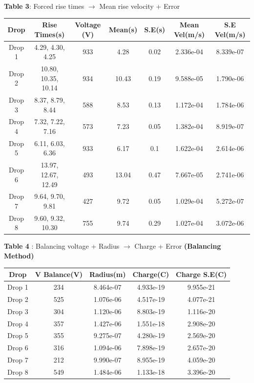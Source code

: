 \documentclass{article}
\begin{document}
\vspace{20pt}

\textbf{Table 3}: Forced rise times $\rightarrow$ Mean rise velocity + Error

\begin{tabular}{|c|c|c|c|c|S|S|}
  \hline
  \textbf{Drop} & \textbf{Rise Times(s)} & \textbf{Voltage (V)} & \textbf{Mean(s)} & \textbf{S.E(s)} & \textbf{Mean Vel(m/s)} & \textbf{S.E Vel(m/s)} \\
  \hline
  Drop 1 & 4.29, 4.30, 4.25 & 933 & 4.28 & 0.02 & 2.336e-04 & 8.339e-07 \\
  Drop 2 & 10.80, 10.35, 10.14 & 934 & 10.43 & 0.19 & 9.588e-05 & 1.790e-06 \\
  Drop 3 & 8.37, 8.79, 8.44 & 588 & 8.53 & 0.13 & 1.172e-04 & 1.784e-06 \\
  Drop 4 & 7.32, 7.22, 7.16 & 573 & 7.23 & 0.05 & 1.382e-04 & 8.919e-07 \\
  Drop 5 & 6.11, 6.03, 6.36 & 933 & 6.17 & 0.1 & 1.622e-04 & 2.614e-06 \\
  Drop 6 & 13.97, 12.67, 12.49 & 493 & 13.04 & 0.47 & 7.667e-05 & 2.741e-06 \\
  Drop 7 & 9.64, 9.70, 9.81 & 427 & 9.72 & 0.05 & 1.029e-04 & 5.272e-07 \\
  Drop 8 & 9.60, 9.32, 10.30 & 755 & 9.74 & 0.29 & 1.027e-04 & 3.072e-06 \\
  \hline
\end{tabular}

\vspace{20pt}

\textbf{Table 4} : Balancing voltage + Radius $\rightarrow$ Charge + Error \textbf{(Balancing Method)}

\begin{tabular}{|c|c|S|S|S|}
  \hline
  \textbf{Drop} & \textbf{V Balance(V)} & \textbf{Radius(m)} & \textbf{Charge(C)} & \textbf{Charge S.E(C)} \\
  \hline
  Drop 1 & 234 & 8.464e-07 & 4.933e-19 & 9.955e-21 \\
  Drop 2 & 525 & 1.076e-06 & 4.517e-19 & 4.077e-21 \\
  Drop 3 & 304 & 1.120e-06 & 8.803e-19 & 1.116e-20 \\
  Drop 4 & 357 & 1.427e-06 & 1.551e-18 & 2.908e-20 \\
  Drop 5 & 355 & 9.275e-07 & 4.280e-19 & 2.569e-20 \\
  Drop 6 & 316 & 1.094e-06 & 7.898e-19 & 2.657e-20 \\
  Drop 7 & 212 & 9.990e-07 & 8.955e-19 & 4.059e-20 \\
  Drop 8 & 549 & 1.484e-06 & 1.133e-18 & 3.396e-20 \\
  \hline
\end{tabular}
\end{document}
